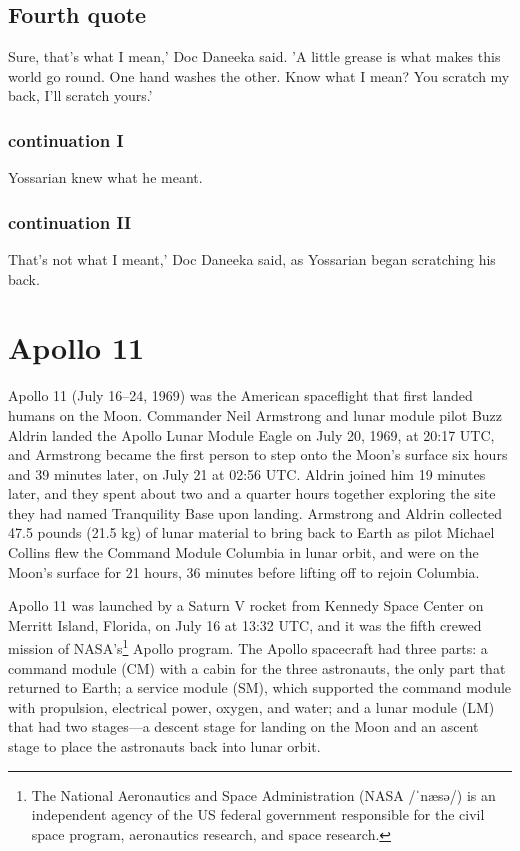 \documentclass[14pt,a4paper]{report}
\begin{document}
\section{Fourth quote}
Sure, that's what I mean,' Doc Daneeka said. 'A little grease is what makes this world go round. One hand washes the other. Know what I mean? You scratch my back, I'll scratch yours\cite{heller1999catch}.'

\subsection{continuation I}
Yossarian knew what he meant.

\subsection{continuation II}
That's not what I meant,' Doc Daneeka said, as Yossarian began scratching his back.

\chapter{Apollo 11}
Apollo 11 (July 16–24, 1969) was the American spaceflight that first landed humans on the Moon. Commander Neil Armstrong and lunar module pilot Buzz Aldrin landed the Apollo Lunar Module Eagle on July 20, 1969, at 20:17 UTC, and Armstrong became the first person to step onto the Moon's surface six hours and 39 minutes later, on July 21 at 02:56 UTC. Aldrin joined him 19 minutes later, and they spent about two and a quarter hours together exploring the site they had named Tranquility Base upon landing. Armstrong and Aldrin collected 47.5 pounds (21.5 kg) of lunar material to bring back to Earth as pilot Michael Collins flew the Command Module Columbia in lunar orbit, and were on the Moon's surface for 21 hours, 36 minutes before lifting off to rejoin Columbia.

Apollo 11 was launched by a Saturn V rocket from Kennedy Space Center on Merritt Island, Florida, on July 16 at 13:32 UTC, and it was the fifth crewed mission of NASA's\footnote{The National Aeronautics and Space Administration (NASA /ˈnæsə/) is an independent agency of the US federal government responsible for the civil space program, aeronautics research, and space research.} Apollo program. The Apollo spacecraft had three parts: a command module (CM) with a cabin for the three astronauts, the only part that returned to Earth; a service module (SM), which supported the command module with propulsion, electrical power, oxygen, and water; and a lunar module (LM) that had two stages—a descent stage for landing on the Moon and an ascent stage to place the astronauts back into lunar orbit.
\end{document}

